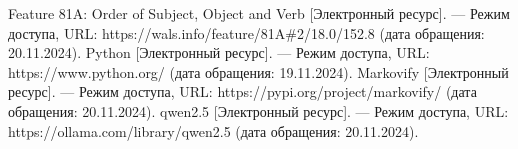 \begin{thebibliography}{}
	 Feature 81A: Order of Subject, Object and Verb [Электронный ресурс]. — Режим доступа, URL: https://wals.info/feature/81A\#2/18.0/152.8 (дата обращения: 20.11.2024).
	 Python [Электронный ресурс]. — Режим доступа, URL: https://www.python.org/ (дата обращения: 19.11.2024).
	 Markovify [Электронный ресурс]. — Режим доступа, URL: https://pypi.org/project/markovify/ (дата обращения: 20.11.2024).
	 qwen2.5 [Электронный ресурс]. — Режим доступа, URL: https://ollama.com/library/qwen2.5 (дата обращения: 20.11.2024).
\end{thebibliography}
